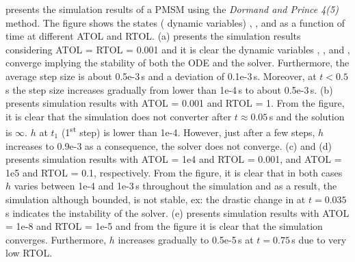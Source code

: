  presents the simulation results of a PMSM using the \textit{Dormand and Prince 4(5)} method. The figure shows the states ( dynamic variables) \id, \iq, and \wm as a function of time at different ATOL and RTOL. (a) presents the simulation results considering ATOL = RTOL = 0.001 and it is clear the dynamic variables \id, \iq, and \wm, converge implying the stability of both the ODE and the solver. Furthermore, the average step size is about 0.5e-3\,s and a deviation of 0.1e-3\,s. Moreover, at $t < 0.5$\,s the step size increases gradually from lower than 1e-4\,s to about 0.5e-3\,s. (b) presents simulation results with ATOL = 0.001 and RTOL = 1. From the figure, it is clear that the simulation does not converter after $t \approx 0.05$\,s and the solution is $\infty$. $h$ at $t_1$ (1\textsuperscript{st} step) is lower than 1e-4. However, just after a few steps, $h$ increases to 0.9e-3 as a consequence, the solver does not converge. (c) and (d) presents simulation results with ATOL = 1e4 and RTOL = 0.001, and ATOL = 1e5 and RTOL = 0.1, respectively. From the figure, it is clear that in both cases $h$ varies between 1e-4 and 1e-3\,s throughout the simulation and as a result, the simulation although bounded, is not stable, ex: the drastic change in \wm at $t = 0.035$\,s indicates the instability of the solver. (e) presents simulation results with ATOL = 1e-8 and RTOL = 1e-5 and from the figure it is clear that the simulation converges. Furthermore, $h$ increases gradually to 0.5e-5\,s at $t = 0.75$\,s due to very low RTOL. 



